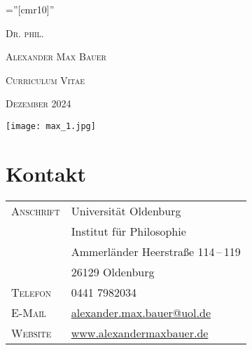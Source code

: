 \documentclass[a4paper,10pt]{article}
\begin{document}
\pagestyle{plain}
\font\fb=''[cmr10]''

\par{\centering
   {\Large\textsc{Dr\hspace{0.5pt}. phil\hspace{0.5pt}.}
   }\bigskip\par}

\par{\centering
   {\Huge\textsc{Alexander Max Bauer}
   }\bigskip\par}

\vspace{1cm}
\par{\centering
   {\Large\textsc{Curriculum Vitae}
   }\bigskip\par}

\par{\centering
   {\Large\textsc{Dezember 2024}
   }\bigskip\par}

\vspace{1cm}
\begin{center}
   \texttt{[image: max\_1.jpg]}
\end{center}
\vspace{1cm}


\section{Kontakt}
\begin{longtable}{p{}p{}}
   \textsc{Anschrift}   & Universität Oldenburg\\
                        & Institut für Philosophie\\
                        & Ammerländer Heerstraße 114\,--\,119\\
                        & 26129 Oldenburg\\
   \textsc{Telefon}     & 0441 7982034\\
   \textsc{E-Mail}      & \href{mailto:alexander.max.bauer@uol.de}{alexander.max.bauer@uol.de}\\
   \textsc{Website}     & \href{http://www.alexandermaxbauer.de/}{www.alexandermaxbauer.de}
\end{longtable}


\clearpage
\end{document}
